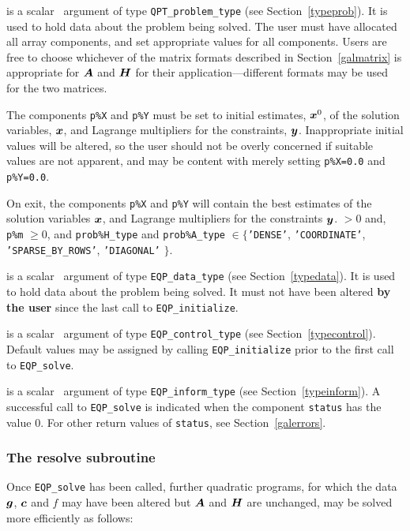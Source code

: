 \documentclass{galahad}
\newcommand{\packagename}{EQP}
\begin{document}
\vspace*{-3mm}
\begin{description}
 is a scalar \intentinout\ argument of type 
{\tt QPT\_problem\_type}
(see Section~\ref{typeprob}). 
It is used to hold data about the problem being solved.
The user must have allocated all array components,
and set appropriate values for all components.
Users are free to choose whichever
of the matrix formats described in Section~\ref{galmatrix} 
is appropriate for ${\bm{A}}$ and ${\bm{H}}$ for their application---different 
formats may be used for the two matrices.

The components {\tt p\%X} and {\tt p\%Y}
must be set to initial estimates, ${\bm{x}}^{0}$, of the solution variables, 
${\bm{x}}$, and Lagrange multipliers for the constraints, ${\bm{y}}$.
Inappropriate initial values will be altered, so the user should
not be overly concerned if suitable values are not apparent, and may be
content with merely setting {\tt p\%X=0.0} and {\tt p\%Y=0.0}.

On exit, the components {\tt p\%X} and {\tt p\%Y}
will contain the best estimates of the solution variables ${\bm{x}}$, and
Lagrange multipliers for the constraints ${\bm{y}}$.
 $> 0$ and, {\tt p\%m} $\geq 0$,
and {\tt prob\%H\_type} and {\tt prob\%A\_type} 
 $\in \{${\tt 'DENSE'}, {\tt 'COORDINATE'}, 
{\tt 'SPARSE\_BY\_ROWS'}, {\tt 'DIAGONAL'} $\}$. 

 is a scalar \intentinout\ argument of type 
{\tt \packagename\_data\_type}
(see Section~\ref{typedata}). It is used to hold data about the problem being 
solved. It must not have been altered {\bf by the user} since the last call to 
{\tt \packagename\_initialize}.

 is a scalar \intentinout\ argument of type 
{\tt \packagename\_control\_type}
(see Section~\ref{typecontrol}). Default values may be assigned by calling 
{\tt \packagename\_initialize} prior to the first call to 
{\tt \packagename\_solve}.

 is a scalar \intentout\ argument of type 
{\tt \packagename\_inform\_type}
(see Section~\ref{typeinform}). A successful call to
{\tt \packagename\_solve}
is indicated when the  component {\tt status} has the value 0. 
For other return values of {\tt status}, see Section~\ref{galerrors}.

\end{description}


\subsubsection{The resolve subroutine}
Once {\tt \packagename\_solve} has been called, further 
quadratic programs, for which the data ${\bm{g}}$, ${\bm{c}}$ and $f$ may have 
been altered but ${\bm{A}}$ and ${\bm{H}}$ are unchanged, may be solved 
more efficiently as follows:
\vspace*{1mm}
\end{document}
